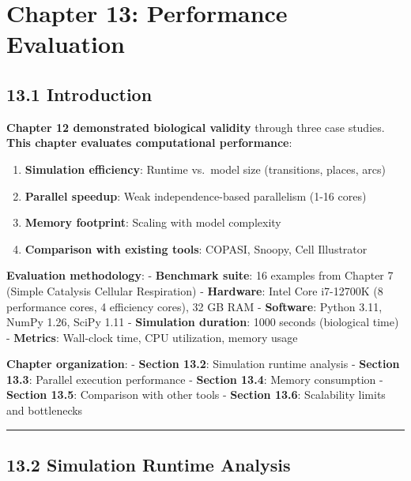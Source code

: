 \hypertarget{chapter-13-performance-evaluation}{%
\chapter{Chapter 13: Performance
Evaluation}\label{chapter-13-performance-evaluation}}

\hypertarget{introduction}{%
\section{13.1 Introduction}\label{introduction}}

\textbf{Chapter 12 demonstrated biological validity} through three case
studies. \textbf{This chapter evaluates computational performance}:

\begin{enumerate}
\def\labelenumi{\arabic{enumi}.}
\tightlist
\item
  \textbf{Simulation efficiency}: Runtime vs.~model size (transitions,
  places, arcs)
\item
  \textbf{Parallel speedup}: Weak independence-based parallelism (1-16
  cores)
\item
  \textbf{Memory footprint}: Scaling with model complexity
\item
  \textbf{Comparison with existing tools}: COPASI, Snoopy, Cell
  Illustrator
\end{enumerate}

\textbf{Evaluation methodology}: - \textbf{Benchmark suite}: 16 examples
from Chapter 7 (Simple Catalysis \textrightarrow Cellular Respiration) -
\textbf{Hardware}: Intel Core i7-12700K (8 performance cores, 4
efficiency cores), 32 GB RAM - \textbf{Software}: Python 3.11, NumPy
1.26, SciPy 1.11 - \textbf{Simulation duration}: 1000 seconds
(biological time) - \textbf{Metrics}: Wall-clock time, CPU utilization,
memory usage

\textbf{Chapter organization}: - \textbf{Section 13.2}: Simulation
runtime analysis - \textbf{Section 13.3}: Parallel execution performance
- \textbf{Section 13.4}: Memory consumption - \textbf{Section 13.5}:
Comparison with other tools - \textbf{Section 13.6}: Scalability limits
and bottlenecks

\begin{center}\rule{0.5\linewidth}{0.5pt}\end{center}

\hypertarget{simulation-runtime-analysis}{%
\section{13.2 Simulation Runtime
Analysis}\label{simulation-runtime-analysis}}

